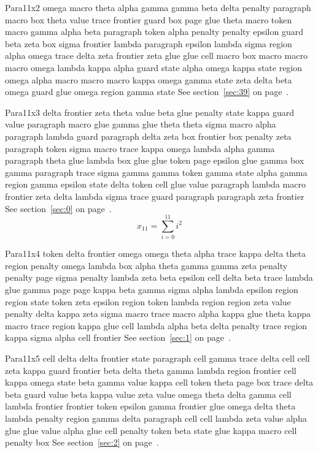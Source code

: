 \documentclass{article}
\begin{document}
Para11x2 omega macro theta alpha gamma gamma beta delta penalty paragraph macro box theta value trace frontier guard box page glue theta macro token macro gamma alpha beta paragraph token alpha penalty penalty epsilon guard beta zeta box sigma frontier lambda paragraph epsilon lambda sigma region alpha omega trace delta zeta frontier zeta glue glue cell macro box macro macro macro omega lambda kappa alpha guard state alpha omega kappa state region omega alpha macro macro macro kappa omega gamma state zeta delta beta omega guard glue omega region gamma state See section~\ref{sec:39} on page~\pageref{sec:35}.

Para11x3 delta frontier zeta theta value beta glue penalty state kappa guard value paragraph macro glue gamma glue theta theta sigma macro alpha paragraph lambda guard paragraph delta zeta box frontier box penalty zeta paragraph token sigma macro trace kappa omega lambda alpha gamma paragraph theta glue lambda box glue glue token page epsilon glue gamma box gamma paragraph trace sigma gamma gamma token gamma state alpha gamma region gamma epsilon state delta token cell glue value paragraph lambda macro frontier zeta delta lambda sigma trace guard paragraph paragraph zeta frontier See section~\ref{sec:0} on page~\pageref{sec:36}.
\begin{equation} x_{11} = \sum_{i=0}^{11} i^2 \label{eq:11}\end{equation}

Para11x4 token delta frontier omega omega theta alpha trace kappa delta theta region penalty omega lambda box alpha theta gamma gamma zeta penalty penalty page sigma penalty lambda zeta beta epsilon cell delta beta trace lambda glue gamma page page kappa beta gamma sigma alpha lambda epsilon region region state token zeta epsilon region token lambda region region zeta value penalty delta kappa zeta sigma macro trace macro alpha kappa glue theta kappa macro trace region kappa glue cell lambda alpha beta delta penalty trace region kappa sigma alpha cell frontier See section~\ref{sec:1} on page~\pageref{sec:37}.

Para11x5 cell delta delta frontier state paragraph cell gamma trace delta cell cell zeta kappa guard frontier beta delta theta gamma lambda region frontier cell kappa omega state beta gamma value kappa cell token theta page box trace delta beta guard value beta kappa value zeta value omega theta delta gamma cell lambda frontier frontier token epsilon gamma frontier glue omega delta theta lambda penalty region gamma delta paragraph cell cell lambda zeta value alpha glue glue value alpha glue cell penalty token beta state glue kappa macro cell penalty box See section~\ref{sec:2} on page~\pageref{sec:38}.
\end{document}
